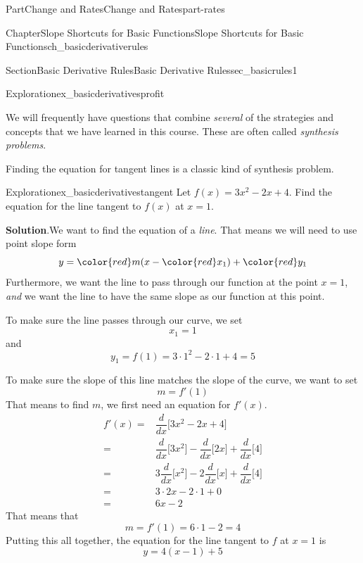 \documentclass{tufte-book}
\newcommand{\blocktitlefont}{\relax}
\numberwithin{equation}{chapter}
\newcommand{\red}[1]{   {\color{red}   #1}   }
\newcommand{\ddx}[1]{ \dfrac{d}{dx} \Big[ #1 \Big]  }
\newcommand{\amp}{&}
\begin{document}
\begin{partptx}{Part}{Change and Rates}{}{Change and Rates}{}{}{part-rates}
\begin{chapterptx}{Chapter}{Slope Shortcuts for Basic Functions}{}{Slope Shortcuts for Basic Functions}{}{}{ch_basicderivativerules}
\begin{sectionptx}{Section}{Basic Derivative Rules}{}{Basic Derivative Rules}{}{}{sec_basicrules1}
\begin{exploration}{Exploration}{}{ex_basicderivativesprofit}
\end{exploration}%
We will frequently have questions that combine \emph{several} of the strategies and concepts that we have learned in this course.  These are often called \emph{synthesis problems}.%
\par
Finding the equation for tangent lines is a classic kind of synthesis problem.%
\begin{exploration}{Exploration}{}{ex_basicderivativestangent}%
Let \(f(x) = 3x^2 - 2x + 4\). Find the equation for the line tangent to \(f(x)\) at \(x=1\).%
\par\smallskip%
\noindent\textbf{\blocktitlefont Solution}.\hypertarget{ex_basicderivativestangent-2}{}\quad{}We want to find the equation of a \emph{line}.  That means we will need to use point slope form%
\begin{equation*}
y = \red{m} (x- \red{x_1}) + \red{y_1}
\end{equation*}
Furthermore, we want the line to pass through our function at the point \(x=1\), \emph{and} we want the line to have the same slope as our function at this point.%
\par
To make sure the line passes through our curve, we set%
\begin{equation*}
x_1 = 1
\end{equation*}
and%
\begin{equation*}
y_1 = f(1) = 3\cdot 1^2 - 2\cdot 1 + 4 = 5
\end{equation*}
%
\par
To make sure the slope of this line matches the slope of the curve, we want to set%
\begin{equation*}
m = f'(1)
\end{equation*}
That means to find \(m\), we first need an equation for \(f'(x)\).%
\begin{align*}
f'(x) = \amp \ddx{ 3x^2 - 2x + 4} \\
= \amp \ddx{3x^2} - \ddx{2x} + \ddx{4} \\
= \amp 3\ddx{x^2} - 2\ddx{x} + \ddx{4} \\
= \amp 3\cdot 2x - 2\cdot 1 + 0 \\
= \amp 6x -2
\end{align*}
That means that%
\begin{equation*}
m=f'(1) = 6\cdot 1 -2 =4
\end{equation*}
Putting this all together, the equation for the line tangent to \(f\) at \(x=1 \) is%
\begin{equation*}
y = 4 (x-1) + 5
\end{equation*}

\end{exploration}
\end{sectionptx}
\end{chapterptx}
\end{partptx}
\end{document}
